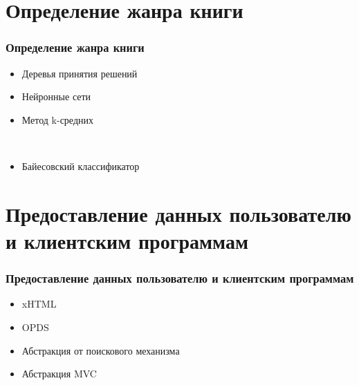 \documentclass[handout]{beamer}
\begin{document}
  

\section{Определение жанра книги}
  \begin{frame}
    \frametitle{Определение жанра книги}  
    
    \begin{itemize}
      \item Деревья принятия решений
      \item Нейронные сети
      \item Метод k-средних
		
	  \ 
		
      \item Байесовский классификатор
    \end{itemize}        
  \end{frame}

\section{Предоставление данных пользователю и клиентским программам}
  \begin{frame}
    \frametitle{Предоставление данных пользователю и клиентским программам}  
    
    \begin{itemize}
      \item xHTML
      \item OPDS
    \end{itemize}        

	\begin{itemize}
      \item Абстракция от поискового механизма
      \item Абстракция MVC
    \end{itemize}        
    
  \end{frame}
\end{document}
